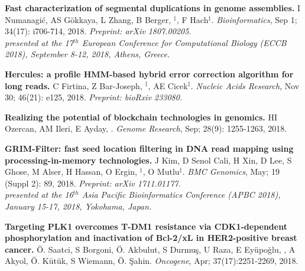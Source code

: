          \vspace{-.2cm}

         {\bf Fast characterization of segmental duplications in genome assemblies.}
         I Numanagić,  AS Gökkaya, L Zhang, B Berger, \calkan{}$^\ddag$, F Hach$^\ddag$.
         {\em Bioinformatics}, Sep 1; 34(17): i706-714, 2018. \textit{Preprint: arXiv 1807.00205.}\\
         \hspace*{1cm}
          {\footnotesize \em presented at the 17$^{th}$ European Conference for Computational Biology (ECCB 2018), September 8-12, 2018, Athens, Greece.}

\vspace{-.2cm}
                {\bf Hercules: a profile HMM-based hybrid error correction algorithm for long reads.}
                C Firtina, Z Bar-Joseph, \calkan{}$^\ddag$, AE Cicek$^\ddag$.
                {\it Nucleic Acids Research}, Nov 30; 46(21): e125, 2018. \textit{Preprint: bioRxiv 233080.}

          
         \vspace{-.2cm}

         {\bf Realizing the potential of blockchain technologies in genomics.}
         HI Ozercan, AM Ileri, E Ayday, \calkan{}.
         {\em Genome Research}, Sep; 28(9): 1255-1263, 2018.

          \vspace{-.2cm}

         {\bf GRIM-Filter: fast seed location filtering in DNA read mapping using processing-in-memory technologies.}
         J Kim, D Senol Cali, H Xin, D Lee, S Ghose, M Alser, H Hassan, O Ergin, \calkan{}$^\ddag$, O Mutlu$^\ddag$.
         {\em BMC Genomics}, May; 19 (Suppl 2): 89, 2018. \textit{Preprint: arXiv 1711.01177.}\\
         \hspace*{1cm}
          {\footnotesize \em presented at the 16$^{th}$ Asia Pacific Bioinformatics Conference (APBC 2018), January 15-17, 2018, Yokohama, Japan.}

         \vspace{-.2cm}        

         {\bf Targeting PLK1 overcomes T-DM1 resistance via CDK1-dependent phosphorylation and inactivation of Bcl-2/xL in HER2-positive breast cancer.}
         Ö. Saatci, S Borgoni, Ö. Akbulut, S Durmuş, U Raza, E Eyüpoğlu, \calkan{}, A Akyol, Ö. Kütük, S Wiemann, Ö. Şahin.         
         {\em Oncogene}, Apr; 37(17):2251-2269, 2018.

